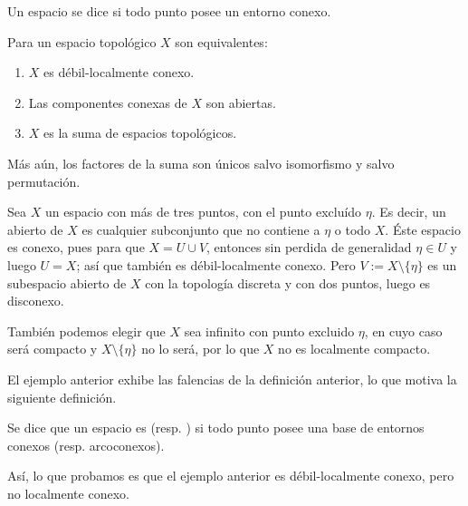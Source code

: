 \documentclass[topologia-analisis.tex]{subfiles}
\begin{document}
\begin{mydef}
	Un espacio se dice  si todo punto posee un entorno conexo.
\end{mydef}
\begin{prop}
	Para un espacio topológico $X$ son equivalentes:
	\begin{enumerate}
		\item $X$ es débil-localmente conexo.
		\item Las componentes conexas de $X$ son abiertas.
		\item $X$ es la suma de espacios topológicos.
	\end{enumerate}
	Más aún, los factores de la suma son únicos salvo isomorfismo y salvo permutación.
\end{prop}

\begin{ex}
	Sea $X$ un espacio con más de tres puntos, con el punto excluído $\eta$.
	Es decir, un abierto de $X$ es cualquier subconjunto que no contiene a $\eta$ o todo $X$.
	Éste espacio es conexo, pues para que $X = U \cup V$, entonces sin perdida de generalidad $\eta \in U$ y luego $U = X$; así que también es
	débil-localmente conexo.
	Pero $V := X \setminus \{ \eta \}$ es un subespacio abierto de $X$ con la topología discreta y con dos puntos, luego es disconexo.

	También podemos elegir que $X$ sea infinito con punto excluido $\eta$, en cuyo caso será compacto y $X \setminus \{ \eta \}$ no lo será,
	por lo que $X$ no es localmente compacto.
\end{ex}
El ejemplo anterior exhibe las falencias de la definición anterior, lo que motiva la siguiente definición.

\begin{mydefi}
	Se dice que un espacio es  (resp. )
	si todo punto posee una base de entornos conexos (resp. arcoconexos).
\end{mydefi}
Así, lo que probamos es que el ejemplo anterior es débil-localmente conexo, pero no localmente conexo.
\end{document}
